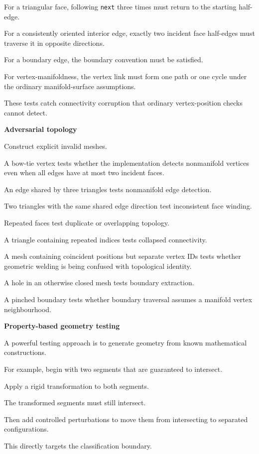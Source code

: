 For a triangular face, following \texttt{next} three times must return to the starting half-edge.

For a consistently oriented interior edge, exactly two incident face half-edges must traverse it in opposite directions.

For a boundary edge, the boundary convention must be satisfied.

For vertex-manifoldness, the vertex link must form one path or one cycle under the ordinary manifold-surface assumptions.

These tests catch connectivity corruption that ordinary vertex-position checks cannot detect.

\textbf{Adversarial topology}

Construct explicit invalid meshes.

A bow-tie vertex tests whether the implementation detects nonmanifold vertices even when all edges have at most two incident faces.

An edge shared by three triangles tests nonmanifold edge detection.

Two triangles with the same shared edge direction test inconsistent face winding.

Repeated faces test duplicate or overlapping topology.

A triangle containing repeated indices tests collapsed connectivity.

A mesh containing coincident positions but separate vertex IDs tests whether geometric welding is being confused with topological identity.

A hole in an otherwise closed mesh tests boundary extraction.

A pinched boundary tests whether boundary traversal assumes a manifold vertex neighbourhood.

\textbf{Property-based geometry testing}

A powerful testing approach is to generate geometry from known mathematical constructions.

For example, begin with two segments that are guaranteed to intersect.

Apply a rigid transformation to both segments.

The transformed segments must still intersect.

Then add controlled perturbations to move them from intersecting to separated configurations.

This directly targets the classification boundary.

